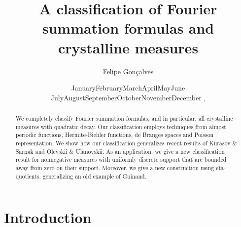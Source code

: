 \documentclass[a4paper,reqno,12pt]{amsart}
\def\today{\ifcase\month\or
  January\or February\or March\or April\or May\or June\or
  July\or August\or September\or October\or November\or December\fi
  \space\number\day, \number\year}
\newcommand{\1}{{\bf 1}}
\renewcommand{\1}{{\bo 1}}
\begin{document}

\title[]{A classification of Fourier summation formulas and crystalline measures}
\author[Gon\c{c}alves]{Felipe Gon\c{c}alves}
\date{\today}
\subjclass[2010]{}
\keywords{}
\address{The University of Texas at Austin, 2515 Speedway, Austin, TX 78712, USA  \newline   {\&} IMPA - Instituto de Matemática Pura e Aplicada, Rio de Janeiro, 22460-320, Brazil.}
\allowdisplaybreaks


\begin{abstract}
We completely classify Fourier summation formulas, and in particular, all crystalline measures with quadratic decay. Our classification employs techniques from almost periodic functions, Hermite-Biehler functions, de Branges spaces and Poisson representation. We show how our classification generalizes recent results of Kurasov \& Sarnak and Olevskii \& Ulanovskii. As an application, we give a new classification result for nonnegative measures with uniformly discrete support that are bounded away from zero on their support. Moreover, we give a new construction using eta-quotients, generalizing an old example of Guinand.
\end{abstract}


\maketitle




\section{Introduction}
\end{document}
